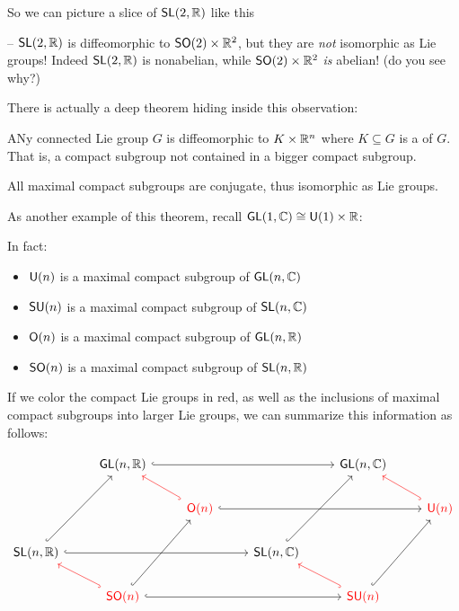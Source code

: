 \documentclass[../main.tex]{subfiles}
\begin{document}
So we can picture a slice of $\mathsf{SL}(2, \mathbb{R})$ like this


\warning -- $\mathsf{SL}(2, \mathbb{R})$ is diffeomorphic to $\mathsf{SO}(2) \times \mathbb{R}^2$,
but they are \emph{not} isomorphic as Lie groups! Indeed $\mathsf{SL}(2, \mathbb{R})$ is
nonabelian, while $\mathsf{SO}(2) \times \mathbb{R}^2$ \emph{is} abelian! (do you see why?)

There is actually a deep theorem hiding inside this observation:

\begin{thm}
  ANy connected Lie group $G$ is diffeomorphic to $K \times \mathbb{R}^n$ where
  $K \subseteq G$ is a  of $G$. That is,
  a compact subgroup not contained in a bigger compact subgroup.

  All maximal compact subgroups are conjugate, thus isomorphic as Lie groups.
\end{thm}

As another example of this theorem, recall $\mathsf{GL}(1,\mathbb{C}) \cong \mathsf{U}(1) \times \mathbb{R}$:


In fact:

\begin{thm}
  \begin{itemize}
    \item $\mathsf{U}(n)$ is a maximal compact subgroup of $\mathsf{GL}(n,\mathbb{C})$   
    \item $\mathsf{SU}(n)$ is a maximal compact subgroup of $\mathsf{SL}(n,\mathbb{C})$
    \item $\mathsf{O}(n)$ is a maximal compact subgroup of $\mathsf{GL}(n,\mathbb{R})$
    \item $\mathsf{SO}(n)$ is a maximal compact subgroup of $\mathsf{SL}(n,\mathbb{R})$
  \end{itemize}
\end{thm}

If we color the compact Lie groups in red, as well as the inclusions
of maximal compact subgroups into larger Lie groups, we can summarize this
information as follows:

\[\begin{tikzcd}
  & {\mathsf{GL}(n,\mathbb{R})} &&& {\mathsf{GL}(n,\mathbb{C})} \\
  && {\color{red}{\mathsf{O}(n)}} &&& {\color{red}{\mathsf{U}(n)}} \\
	{\mathsf{SL}(n,\mathbb{R})} &&& {\mathsf{SL}(n,\mathbb{C})} \\
  & {\color{red}{\mathsf{SO}(n)}} &&& {\color{red}{\mathsf{SU}(n)}}
	\arrow[hook, from=4-2, to=3-1, color=red]
	\arrow[hook, from=3-1, to=1-2]
	\arrow[hook, from=4-2, to=2-3]
	\arrow[hook, from=2-3, to=1-2, color=red]
	\arrow[hook, from=4-5, to=2-6]
	\arrow[hook, from=4-5, to=3-4, color=red]
	\arrow[hook, from=3-4, to=1-5]
	\arrow[hook, from=2-6, to=1-5, color=red]
	\arrow[hook, from=1-2, to=1-5]
	\arrow[hook, from=3-1, to=3-4]
	\arrow[hook, from=4-2, to=4-5]
	\arrow[hook, from=2-3, to=2-6]
\end{tikzcd}\]
\end{document}
